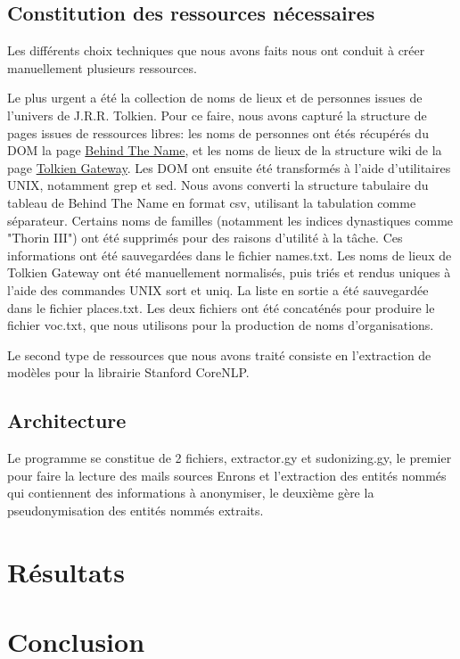 \documentclass{article}
\begin{document}
\subsection{Constitution des ressources nécessaires}
\par
Les différents choix techniques que nous avons faits nous ont conduit à créer manuellement plusieurs ressources.
\par
Le plus urgent a été la collection de noms de lieux et de personnes issues de l'univers de J.R.R. Tolkien.
Pour ce faire, nous avons capturé la structure de pages issues de ressources libres: les noms de personnes ont étés récupérés du DOM la page \href{https://www.behindthename.com/namesakes/list/tolkien/alpha}{Behind The Name}, et les noms de lieux de la structure wiki de la page \href{http://tolkiengateway.net/w/index.php?title=List_of_Place_Names}{Tolkien Gateway}.
Les DOM ont ensuite été transformés à l'aide d'utilitaires UNIX, notamment grep et sed.
Nous avons converti la structure tabulaire du tableau de Behind The Name en format csv, utilisant la tabulation comme séparateur.
Certains noms de familles (notamment les indices dynastiques comme "Thorin III") ont été supprimés pour des raisons d'utilité à la tâche.
Ces informations ont été sauvegardées dans le fichier names.txt.
Les noms de lieux de Tolkien Gateway ont été manuellement normalisés, puis triés et rendus uniques à l'aide des commandes UNIX sort et uniq.
La liste en sortie a été sauvegardée dans le fichier places.txt.
Les deux fichiers ont été concaténés pour produire le fichier voc.txt, que nous utilisons pour la production de noms d'organisations.
\par
Le second type de ressources que nous avons traité consiste en l'extraction de modèles pour la librairie Stanford CoreNLP.

\subsection{Architecture}
Le programme se constitue de 2 fichiers, extractor.gy et sudonizing.gy, le premier pour faire la lecture des mails sources Enrons et l'extraction des entités nommés qui contiennent des informations à anonymiser, le deuxième gère la pseudonymisation des entités nommés extraits. 


\section{Résultats}

\section{Conclusion}
\end{document}
